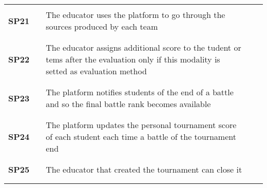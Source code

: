 \begin{longtable}[H]{l l p{8.5cm} l l}
                  &        &                                                                                                          &        &                        \\\hline & & & & \\
    \textbf{SP21} & \vline & The educator uses the platform to go through the sources produced by each team                           & \vline &                        \\
                  &        &                                                                                                          &        &                        \\\hline & & & & \\
    \textbf{SP22} & \vline & The educator assigns additional score to the tudent or tems after the evaluation only if this modality is setted as evaluation method                                  & \vline &                        \\
                  &        &                                                                                                          &        &                        \\\hline & & & & \\
    \textbf{SP23} & \vline & The platform notifies students of the end of a battle and so the final battle rank becomes available                             & \vline &                        \\
                  &        &                                                                                                          &        &                        \\\hline & & & & \\
    \textbf{SP24} & \vline & The platform updates the personal tournament score of each student each time a battle of the tournament end                                       & \vline &                        \\
                  &        &                                                                                                          &        &                        \\\hline & & & & \\
    \textbf{SP25} & \vline & The educator that created the tournament can close it                                                                          & \vline &                        \\
                  &        &                                                                                                          &        &                        \\\hline & & & & \\

\end{longtable}
